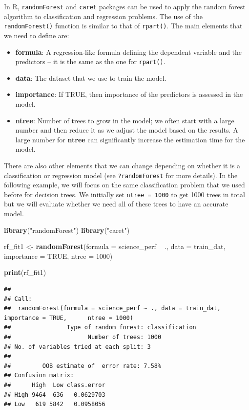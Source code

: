 \documentclass[]{book}
\newenvironment{Shaded}{\begin{snugshade}}{\end{snugshade}}
\newcommand{\DataTypeTok}[1]{\textcolor[rgb]{0.13,0.29,0.53}{#1}}
\newcommand{\DecValTok}[1]{\textcolor[rgb]{0.00,0.00,0.81}{#1}}
\newcommand{\KeywordTok}[1]{\textcolor[rgb]{0.13,0.29,0.53}{\textbf{#1}}}
\newcommand{\NormalTok}[1]{#1}
\newcommand{\OperatorTok}[1]{\textcolor[rgb]{0.81,0.36,0.00}{\textbf{#1}}}
\newcommand{\OtherTok}[1]{\textcolor[rgb]{0.56,0.35,0.01}{#1}}
\newcommand{\StringTok}[1]{\textcolor[rgb]{0.31,0.60,0.02}{#1}}
\providecommand{\tightlist}{%
  \setlength{\itemsep}{0pt}\setlength{\parskip}{0pt}}
\begin{document}
In R, \texttt{randomForest} and \texttt{caret} packages can be used to apply the random forest algorithm to classification and regression problems. The use of the \texttt{randomForest()} function is similar to that of \texttt{rpart()}. The main elements that we need to define are:

\begin{itemize}
\tightlist
\item
  \textbf{formula}: A regression-like formula defining the dependent variable and the predictors -- it is the same as the one for \texttt{rpart()}.
\item
  \textbf{data}: The dataset that we use to train the model.
\item
  \textbf{importance}: If TRUE, then importance of the predictors is assessed in the model.
\item
  \textbf{ntree}: Number of trees to grow in the model; we often start with a large number and then reduce it as we adjust the model based on the results. A large number for \textbf{ntree} can significantly increase the estimation time for the model.
\end{itemize}

There are also other elements that we can change depending on whether it is a classification or regression model (see \texttt{?randomForest} for more details). In the following example, we will focus on the same classification problem that we used before for decision trees. We initially set \texttt{ntree\ =\ 1000} to get 1000 trees in total but we will evaluate whether we need all of these trees to have an accurate model.

\begin{Shaded}
\begin{Highlighting}[]
\KeywordTok{library}\NormalTok{(}\StringTok{"randomForest"}\NormalTok{)}
\KeywordTok{library}\NormalTok{(}\StringTok{"caret"}\NormalTok{)}

\NormalTok{rf_fit1 <-}\StringTok{ }\KeywordTok{randomForest}\NormalTok{(}\DataTypeTok{formula =}\NormalTok{ science_perf }\OperatorTok{~}\StringTok{ }\NormalTok{.,}
                        \DataTypeTok{data =}\NormalTok{ train_dat,}
                        \DataTypeTok{importance =} \OtherTok{TRUE}\NormalTok{, }\DataTypeTok{ntree =} \DecValTok{1000}\NormalTok{)}

\KeywordTok{print}\NormalTok{(rf_fit1)}
\end{Highlighting}
\end{Shaded}

\begin{verbatim}
## 
## Call:
##  randomForest(formula = science_perf ~ ., data = train_dat, importance = TRUE,      ntree = 1000) 
##                Type of random forest: classification
##                      Number of trees: 1000
## No. of variables tried at each split: 3
## 
##         OOB estimate of  error rate: 7.58%
## Confusion matrix:
##      High  Low class.error
## High 9464  636   0.0629703
## Low   619 5842   0.0958056
\end{verbatim}
\end{document}
